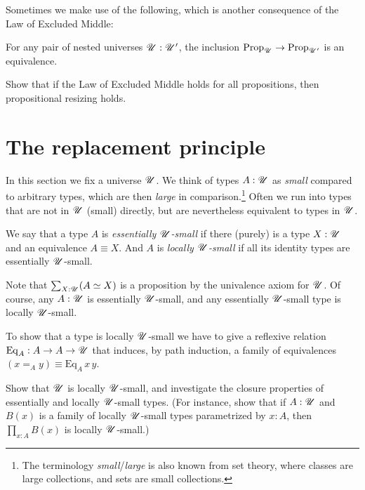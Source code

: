 Sometimes we make use of the following,
which is another consequence of the Law of Excluded Middle:
\begin{principle}
  \label{pri:prop-resizing}
  For any pair of nested universes ${\mathscr{U}}:{\mathscr{U}}'$, the inclusion
  $\mathrm{Prop}_{\mathscr{U}} \to \mathrm{Prop}_{{\mathscr{U}}'}$ is an equivalence.
\end{principle}
\begin{xca}\label{xca:lem-prop-sizing}
  Show that if the Law of Excluded Middle holds for all propositions,
  then propositional resizing holds.
\end{xca}


\section{The replacement principle}
\label{sec:replacement}

In this section we fix a universe ${\mathscr{U}}$.
We think of types $A:{\mathscr{U}}$ as \emph{small} compared to arbitrary types,
which are then \emph{large} in comparison.\footnote{%
  The terminology \emph{small}/\emph{large} is also known from set theory,
  where classes are large collections,
  and sets are small collections.}
Often we run into types that are not in ${\mathscr{U}}$ (small) directly,
but are nevertheless equivalent to types in ${\mathscr{U}}$.
\begin{definition}\label{def:ess-loc-small}
  We say that a type $A$ is \emph{essentially ${\mathscr{U}}$-small} if there
  (purely) is a type $X:{\mathscr{U}}$ and an equivalence $A \equiv
  X$. And $A$ is \emph{locally ${\mathscr{U}}$-small} if all its identity types
  are essentially ${\mathscr{U}}$-small.
\end{definition}
Note that $\sum_{X:{\mathscr{U}}}(A \simeq X)$ is a proposition by the univalence axiom for ${\mathscr{U}}$.
Of course, any $A:{\mathscr{U}}$ is essentially ${\mathscr{U}}$-small,
and any essentially ${\mathscr{U}}$-small type is locally ${\mathscr{U}}$-small.

To show that a type is locally ${\mathscr{U}}$-small
we have to give a reflexive relation
$\mathrm{Eq}_A : A \to A \to {\mathscr{U}}$
that induces, by path induction, a family of equivalences
$(x=_Ay) \equiv \mathrm{Eq}_A\,x\,y$.

\begin{xca}
  Show that ${\mathscr{U}}$ is locally ${\mathscr{U}}$-small, and investigate
  the closure properties of essentially and locally ${\mathscr{U}}$-small types.
  (For instance, show that if $A:{\mathscr{U}}$ and $B(x)$ is a family of locally ${\mathscr{U}}$-small
  types parametrized by $x:A$, then $\prod_{x:A}B(x)$ is locally ${\mathscr{U}}$-small.)
\end{xca}

